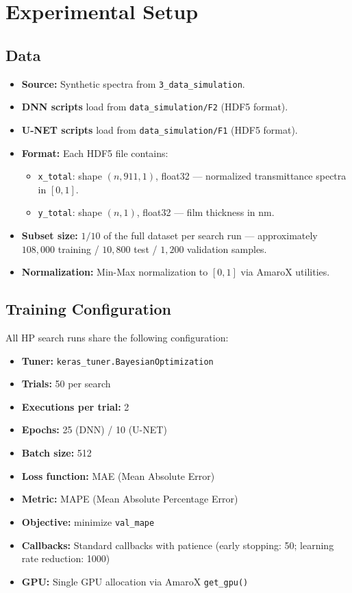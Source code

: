 \documentclass[11pt,a4paper]{article}
\begin{document}
\section{Experimental Setup}

\subsection{Data}

\begin{itemize}
    \item \textbf{Source:} Synthetic spectra from \texttt{3\_data\_simulation}.
    \item \textbf{DNN scripts} load from \texttt{data\_simulation/F2} (HDF5 format).
    \item \textbf{U-NET scripts} load from \texttt{data\_simulation/F1} (HDF5 format).
    \item \textbf{Format:} Each HDF5 file contains:
    \begin{itemize}
        \item \texttt{x\_total}: shape $(n, 911, 1)$, float32 — normalized transmittance spectra in $[0, 1]$.
        \item \texttt{y\_total}: shape $(n, 1)$, float32 — film thickness in nm.
    \end{itemize}
    \item \textbf{Subset size:} $1/10$ of the full dataset per search run — approximately $108{,}000$ training / $10{,}800$ test / $1{,}200$ validation samples.
    \item \textbf{Normalization:} Min-Max normalization to $[0, 1]$ via AmaroX utilities.
\end{itemize}

\subsection{Training Configuration}

All HP search runs share the following configuration:
\begin{itemize}
    \item \textbf{Tuner:} \texttt{keras\_tuner.BayesianOptimization}
    \item \textbf{Trials:} 50 per search
    \item \textbf{Executions per trial:} 2
    \item \textbf{Epochs:} 25 (DNN) / 10 (U-NET)
    \item \textbf{Batch size:} 512
    \item \textbf{Loss function:} MAE (Mean Absolute Error)
    \item \textbf{Metric:} MAPE (Mean Absolute Percentage Error)
    \item \textbf{Objective:} minimize \texttt{val\_mape}
    \item \textbf{Callbacks:} Standard callbacks with patience (early stopping: 50; learning rate reduction: 1000)
    \item \textbf{GPU:} Single GPU allocation via AmaroX \texttt{get\_gpu()}
\end{itemize}
\end{document}
